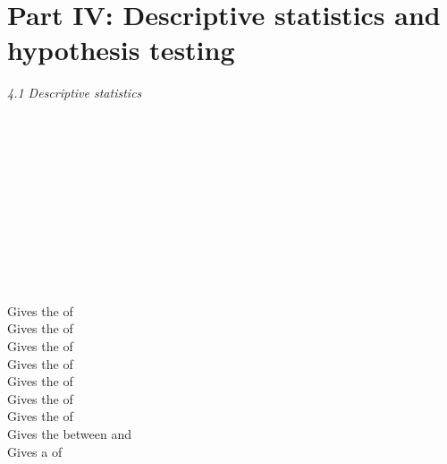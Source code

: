 \label{rhelppartfour}

\section{Part IV: Descriptive statistics and hypothesis testing}

\textit{4.1 Descriptive statistics} \\
\\
\begin{minipage}[t]{.4\textwidth}
\vspace*{-8pt}
 \\ 
 \\
 \\
 \\ 
 \\	
 \\
 \\
 \\
 \\
\end{minipage}
\begin{minipage}[t]{.6\textwidth}
Gives the  of  \\
Gives the  of  \\
Gives the  of  \\
Gives the  of  \\
Gives the  of  \\
Gives the  of  \\
Gives the  of  \\
Gives the  between  and  \\
Gives a  of   \\
\end{minipage}
\vspace*{.5cm}

